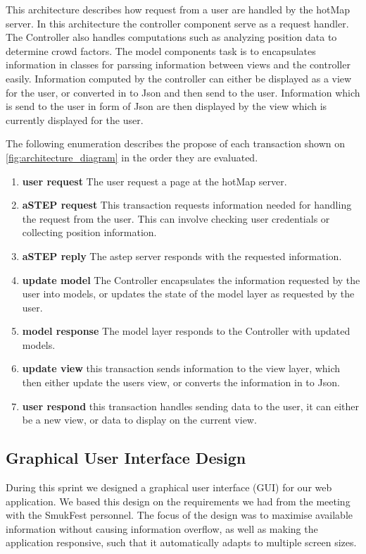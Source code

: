 
This architecture describes how request from a user are handled by the hotMap server.
In this architecture the controller component serve as a request handler. The Controller also handles computations such as analyzing position data to determine crowd factors. 
The model components task is to encapsulates information in classes for parssing information between views and the controller easily. Information computed by the controller can either be displayed as a view for the user, or converted in to Json and then send to the user. Information which is send to the user in form of Json are then displayed by the view which is currently displayed for the user.


The following enumeration describes the propose of each transaction shown on \cref{fig:architecture_diagram} in the order they are evaluated.

\begin{enumerate}
    \item \textbf{user request} The user request a page at the hotMap server.
    \item \textbf{aSTEP request} This transaction requests information needed for handling the request from the user. This can involve checking user credentials or collecting position information.
    \item \textbf{aSTEP reply} The astep server responds with the requested information.
    \item \textbf{update model} The Controller encapsulates the information requested by the user into models, or updates the state of the model layer as requested by the user.
    \item \textbf{model response} The model layer responds to the Controller with updated models.
    \item \textbf{update view} this transaction sends information to the view layer, which then either update the users view, or converts the information in to Json. 
     \item \textbf{user respond} this transaction handles sending data to the user, it can either be a new view, or data to display on the current view.
\end{enumerate}


\subsection{Graphical User Interface Design} \label{sec:s2_gui}

During this sprint we designed a graphical user interface (GUI) for our web application. We based this design on the requirements we had from the meeting with the SmukFest personnel. The focus of the design was to maximise available information without causing information overflow, as well as making the application responsive, such that it automatically adapts to multiple screen sizes. 

